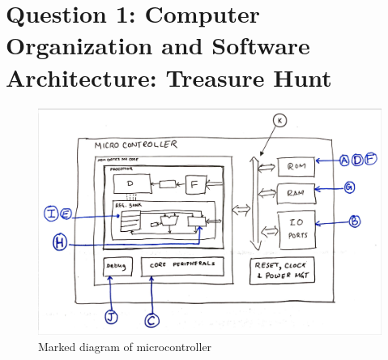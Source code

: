 \section*{Question 1: \small{Computer Organization and Software Architecture: Treasure Hunt}}

\begin{figure}[h]
    \centering
    \includegraphics[width=\linewidth]{figures/images/q1.jpeg}
    \caption{Marked diagram of microcontroller}
\end{figure}

